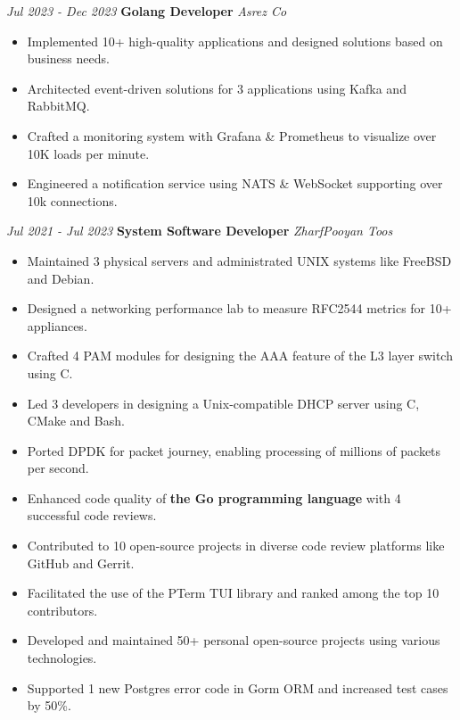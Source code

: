 \documentclass{engineercv}
\begin{document}
\begin{twocolentry}{\textit{Jul 2023 - Dec 2023}}
  \textbf{Golang Developer}
  \textit{Asrez Co}
\end{twocolentry}

\begin{itemize}
  \item Implemented 10+ high-quality applications and designed solutions based on business needs.
  \item Architected event-driven solutions for 3 applications using Kafka and RabbitMQ.
  \item Crafted a monitoring system with Grafana \& Prometheus to visualize over 10K loads per minute.
  \item Engineered a notification service using NATS \& WebSocket supporting over 10k connections.
\end{itemize}

\begin{twocolentry}{\textit{Jul 2021 - Jul 2023}}
  \textbf{System Software Developer}
  \textit{ZharfPooyan Toos}
\end{twocolentry}

\begin{itemize}
  \item Maintained 3 physical servers and administrated UNIX systems like FreeBSD and Debian.
  \item Designed a networking performance lab to measure RFC2544 metrics for 10+ appliances.
  \item Crafted 4 PAM modules for designing the AAA feature of the L3 layer switch using C.
  \item Led 3 developers in designing a Unix-compatible DHCP server using C, CMake and Bash.
  \item Ported DPDK for packet journey, enabling processing of millions of packets per second.
\end{itemize}

\begin{itemize}
  \item Enhanced code quality of \textbf{the Go programming language} with 4 successful code reviews.
  \item Contributed to 10 open-source projects in diverse code review platforms like GitHub and Gerrit.
  \item Facilitated the use of the PTerm TUI library and ranked among the top 10 contributors.
  \item Developed and maintained 50+ personal open-source projects using various technologies.
  \item Supported 1 new Postgres error code in Gorm ORM and increased test cases by 50\%.
\end{itemize}
\end{document}

